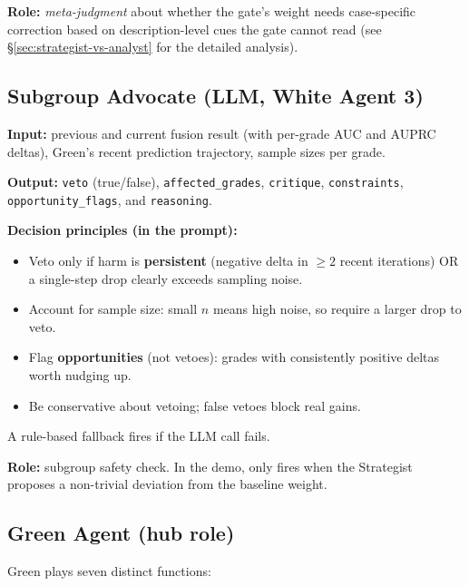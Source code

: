 \documentclass[11pt,a4paper]{article}
\begin{document}
\noindent
\textbf{Role:} \emph{meta-judgment} about whether the gate's weight needs
case-specific correction based on description-level cues the gate cannot
read (see \S\ref{sec:strategist-vs-analyst} for the detailed analysis).

\subsection{Subgroup Advocate (LLM, White Agent 3)}

\noindent
\textbf{Input:} previous and current fusion result (with per-grade AUC and
AUPRC deltas), Green's recent prediction trajectory, sample sizes per grade.

\noindent
\textbf{Output:} \texttt{veto} (true/false), \texttt{affected\_grades},
\texttt{critique}, \texttt{constraints}, \texttt{opportunity\_flags}, and
\texttt{reasoning}.

\noindent
\textbf{Decision principles (in the prompt):}
\begin{itemize}[itemsep=0pt]
    \item Veto only if harm is \textbf{persistent} (negative delta in $\geq 2$ recent
          iterations) OR a single-step drop clearly exceeds sampling noise.
    \item Account for sample size: small $n$ means high noise, so require a
          larger drop to veto.
    \item Flag \textbf{opportunities} (not vetoes): grades with consistently
          positive deltas worth nudging up.
    \item Be conservative about vetoing; false vetoes block real gains.
\end{itemize}
\noindent
A rule-based fallback fires if the LLM call fails.

\noindent
\textbf{Role:} subgroup safety check. In the demo, only fires when the
Strategist proposes a non-trivial deviation from the baseline weight.

\subsection{Green Agent (hub role)}

Green plays seven distinct functions:
\end{document}
